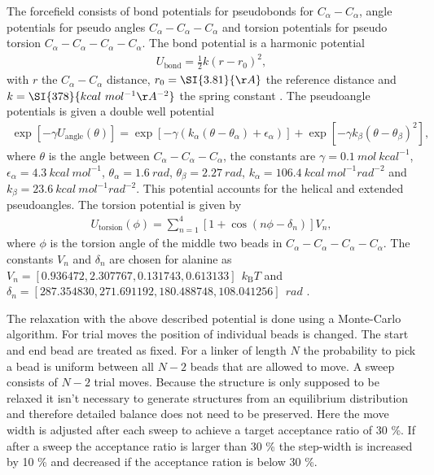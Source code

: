 \documentclass[12pt, twoside]{report}
\begin{document}
The forcefield consists of bond potentials for pseudobonds for
\(C_\alpha\!-\!C_\alpha\), angle potentials for pseudo angles
\(C_\alpha\!-\!C_\alpha\!-\!C_\alpha\) and torsion potentials for pseudo torsion
\(C_\alpha\!-\!C_\alpha\!-\!C_\alpha\!-\!C_\alpha\). The bond potential is a
harmonic potential
\begin{align} U_{\mathrm{bond}} = \frac{1}{2} k (r-r_0)^2,
\end{align} with \(r\) the \(C_\alpha\!-\!C_\alpha\) distance,
\(r_0=\SI{3.81}{\AA}\) the reference distance and \(k=\SI{378}{kcal ~ mol^{-1}
\AA^{-2}}\) the spring constant \cite{Karanicolas2002}. The pseudoangle
potentials is given a double well potential \cite{Best2005}
\begin{align} \exp[-\gamma U_{\mathrm{angle}}(\theta)] =
\exp[-\gamma(k_\alpha(\theta - \theta_\alpha)+\epsilon_\alpha)] + \exp[-\gamma
k_\beta(\theta - \theta_\beta)^2],
\end{align} where \(\theta\) is the angle between
\(C_\alpha\!-\!C_\alpha\!-\!C_\alpha\), the constants are
\(\gamma=\SI{0.1}{mol~kcal^{-1}}\), \(\epsilon_\alpha=\SI{4.3}{kcal ~
mol^{-1}}\), \(\theta_\alpha=\SI{1.6}{rad}\), \(\theta_\beta=\SI{2.27}{rad}\),
\(k_\alpha=\SI{106.4}{kcal ~ mol^{-1} rad^{-2}}\) and \(k_\beta=\SI{23.6}{kcal ~
mol^{-1} rad^{-2}}\). This potential accounts for the helical and extended
pseudoangles. The torsion potential is given by \cite{Karanicolas2002}
\begin{align} U_{\mathrm{torsion}}(\phi) = \sum_{n=1}^4 [1 + \cos(n\phi -
\delta_n)] V_n,
\end{align} where \(\phi\) is the torsion angle of the middle two beads in
\(C_\alpha\!-\!C_\alpha\!-\!C_\alpha\!-\!C_\alpha\). The constants \(V_n\) and
\(\delta_n\) are chosen for alanine as \(V_n=[0.936472, 2.307767, 0.131743
,0.613133]~\SI{}{k_{\mathrm{B}}T}\) and \(\delta_n=[287.354830,271.691192
,180.488748 ,108.041256]~\SI{}{rad}\) \cite{Karanicolas2002}.

The relaxation with the above described potential is done using a Monte-Carlo
algorithm. For trial moves the position of individual beads is changed. The
start and end bead are treated as fixed. For a linker of length \(N\) the
probability to pick a bead is uniform between all \(N-2\) beads that are allowed
to move. A sweep consists of \(N-2\) trial moves. Because the structure is only
supposed to be relaxed it isn't necessary to generate structures from an
equilibrium distribution and therefore detailed balance does not need to be
preserved. Here the move width is adjusted after each sweep to achieve a target
acceptance ratio of 30 \%. If after a sweep the acceptance ratio is larger than
30 \% the step-width is increased by 10 \% and decreased if the acceptance
ration is below 30 \%.
\end{document}
